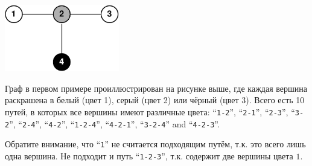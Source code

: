 \section*{}

\includegraphics[width=5cm]{pathsfig.pdf}

Граф в первом примере проиллюстрирован на рисунке выше, где каждая вершина раскрашена в белый (цвет 1), серый (цвет 2) или чёрный (цвет 3). Всего есть 10 путей, в которых все вершины имеют различные цвета: ``\texttt{1-2}'', ``\texttt{2-1}'', ``\texttt{2-3}'', ``\texttt{3-2}'', ``\texttt{2-4}'', ``\texttt{4-2}'', ``\texttt{1-2-4}'', ``\texttt{4-2-1}'', ``\texttt{3-2-4}'' and ``\texttt{4-2-3}''.

Обратите внимание, что ``\texttt{1}'' не считается подходящим путём, т.к. это всего лишь одна вершина. Не подходит и путь ``\texttt{1-2-3}'', т.к. содержит две вершины цвета $1$.
